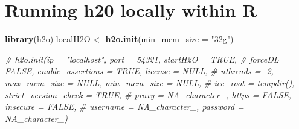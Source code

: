 \documentclass[]{book}
\newenvironment{Shaded}{\begin{snugshade}}{\end{snugshade}}
\newcommand{\KeywordTok}[1]{\textcolor[rgb]{0.13,0.29,0.53}{\textbf{#1}}}
\newcommand{\DataTypeTok}[1]{\textcolor[rgb]{0.13,0.29,0.53}{#1}}
\newcommand{\StringTok}[1]{\textcolor[rgb]{0.31,0.60,0.02}{#1}}
\newcommand{\CommentTok}[1]{\textcolor[rgb]{0.56,0.35,0.01}{\textit{#1}}}
\newcommand{\NormalTok}[1]{#1}
\theoremstyle{definition}
\theoremstyle{definition}
\theoremstyle{definition}
\theoremstyle{remark}
\begin{document}
\section{Running h20 locally within
R}\label{running-h20-locally-within-r}

\begin{Shaded}
\begin{Highlighting}[]
\KeywordTok{library}\NormalTok{(h2o)}
\NormalTok{localH2O <-}\StringTok{ }\KeywordTok{h2o.init}\NormalTok{(}\DataTypeTok{min_mem_size =} \StringTok{"32g"}\NormalTok{)}
\end{Highlighting}
\end{Shaded}

\begin{Shaded}
\begin{Highlighting}[]
\CommentTok{# h2o.init(ip = "localhost", port = 54321, startH2O = TRUE,}
\CommentTok{#          forceDL = FALSE, enable_assertions = TRUE, license = NULL,}
\CommentTok{#          nthreads = -2, max_mem_size = NULL, min_mem_size = NULL,}
\CommentTok{#          ice_root = tempdir(), strict_version_check = TRUE,}
\CommentTok{#          proxy = NA_character_, https = FALSE, insecure = FALSE,}
\CommentTok{#          username = NA_character_, password = NA_character_)}
\end{Highlighting}
\end{Shaded}
\end{document}
